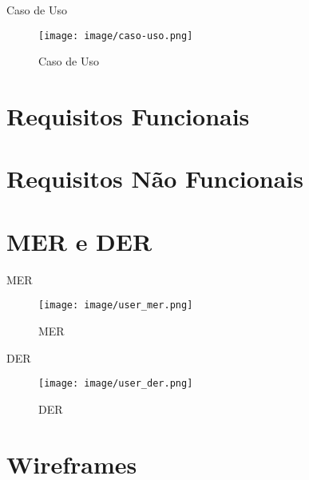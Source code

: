 \documentclass[%
    english,
    brazil]{ifsp-spo-beamer}
\begin{document}
\begin{frame}{Caso de Uso} 
    \begin{table} \centering
        \begin{figure}
                \centering
            	\caption{\label{analise}Caso de Uso}
            	\texttt{[image: image/caso-uso.png]}
        \end{figure}
    \end{table}
\end{frame}

\section{Requisitos Funcionais}


\section{Requisitos Não Funcionais}



\section{MER e DER}

\begin{frame}{MER} 
    \begin{table} \centering
        \begin{figure}
                \centering
            	\caption{\label{analise}MER}
            	\texttt{[image: image/user\_mer.png]}
        \end{figure}
    \end{table}
\end{frame}

\begin{frame}{DER} 
    \begin{table} \centering
        \begin{figure}
                \centering
            	\caption{\label{analise}DER}
            	\texttt{[image: image/user\_der.png]}
        \end{figure}
    \end{table}
\end{frame}


\section{Wireframes}
\end{document}
